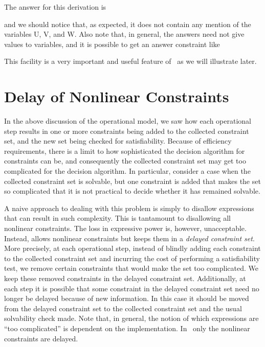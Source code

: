 \noindent
The answer for this derivation is


\noindent
and we should notice that, as expected,
it does not contain any mention of the variables U, V, and W. 
Also note that, in general, the answers need not give values to 
variables, and it is possible to get an answer constraint like


\noindent
This facility is a very important and useful feature of \CLPR\ as we will
illustrate later.

\section{Delay of Nonlinear Constraints} 

In the above discussion of the operational model, we saw how each
operational step results in one or more constraints being added to the
collected constraint set, and the new set being checked for satisfiability.
Because of efficiency requirements, there
is a limit to how sophisticated the decision algorithm for constraints
can be, and consequently the collected constraint set may get too
complicated for the decision algorithm. In particular, consider a case when
the collected constraint set is solvable, but one constraint is added
that makes the set so complicated that it is not practical to decide
whether it has remained solvable. 

A naive approach to dealing with this problem is simply
to disallow expressions that can result in such complexity. 
This is tantamount to disallowing all nonlinear constraints.
The loss in expressive power is, however, unacceptable.
Instead, \CLPR{} allows nonlinear constraints but keeps them in a 
{\em delayed constraint set}. 
More precisely, at each operational
step, instead of blindly adding each constraint to the collected constraint
set and incurring the cost of performing a satisfiability test, 
we remove certain constraints that would make the set too complicated.
We keep these removed constraints in the delayed constraint set. 
Additionally, at each step it is
possible that some constraint in the delayed constraint set need no longer
be delayed because of new information. 
In this case it should be moved
from the delayed constraint set to the collected constraint set and the
usual solvability check made. 
Note that, in general, the notion of which expressions are
``too complicated'' is dependent on the implementation.
In \CLPR\, only the nonlinear constraints are delayed.

